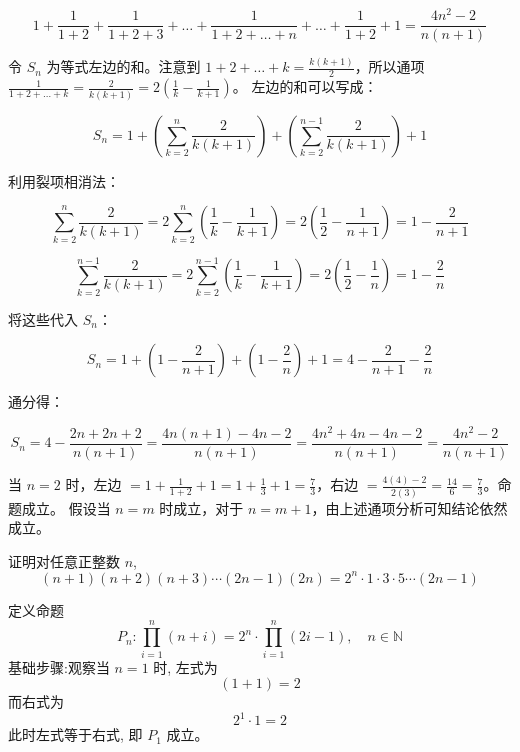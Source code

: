 \begin{questions}
$$1+\frac{1}{1+2}+\frac{1}{1+2+3}+\dots+\frac{1}{1+2+\dots+n}+\dots+\frac{1}{1+2}+1=\frac{4n^2-2}{n(n+1)}$$

\begin{solution}
令 $S_n$ 为等式左边的和。注意到 $1+2+\dots+k = \frac{k(k+1)}{2}$，所以通项 $\frac{1}{1+2+\dots+k} = \frac{2}{k(k+1)} = 2\left(\frac{1}{k}-\frac{1}{k+1}\right)$。
左边的和可以写成：


$$S_n = 1 + \left( \sum_{k=2}^{n} \frac{2}{k(k+1)} \right) + \left( \sum_{k=2}^{n-1} \frac{2}{k(k+1)} \right) + 1$$


利用裂项相消法：


$$\sum_{k=2}^{n} \frac{2}{k(k+1)} = 2 \sum_{k=2}^{n} \left(\frac{1}{k}-\frac{1}{k+1}\right) = 2 \left(\frac{1}{2} - \frac{1}{n+1}\right) = 1 - \frac{2}{n+1}$$

$$\sum_{k=2}^{n-1} \frac{2}{k(k+1)} = 2 \sum_{k=2}^{n-1} \left(\frac{1}{k}-\frac{1}{k+1}\right) = 2 \left(\frac{1}{2} - \frac{1}{n}\right) = 1 - \frac{2}{n}$$


将这些代入 $S_n$：


$$S_n = 1 + \left(1 - \frac{2}{n+1}\right) + \left(1 - \frac{2}{n}\right) + 1 = 4 - \frac{2}{n+1} - \frac{2}{n}$$


通分得：


$$S_n = 4 - \frac{2n+2n+2}{n(n+1)} = \frac{4n(n+1) - 4n - 2}{n(n+1)} = \frac{4n^2+4n-4n-2}{n(n+1)} = \frac{4n^2-2}{n(n+1)}$$


当 $n=2$ 时，左边 $= 1 + \frac{1}{1+2} + 1 = 1 + \frac{1}{3} + 1 = \frac{7}{3}$，右边 $= \frac{4(4)-2}{2(3)} = \frac{14}{6} = \frac{7}{3}$。命题成立。
假设当 $n=m$ 时成立，对于 $n=m+1$，由上述通项分析可知结论依然成立。
\end{solution}
    \question 证明对任意正整数 $n$, 
    \[
    (n + 1)(n + 2)(n + 3) \cdots (2n - 1)(2n) = 2^n \cdot 1 \cdot 3 \cdot 5 \cdots (2n - 1)
    \]
    \begin{solution}
        定义命题
        \[
        P_n:\prod_{i=1}^{n} (n + i) = 2^n \cdot \prod_{i=1}^{n} (2i - 1), \quad n \in \mathbb{N}
        \]
        基础步骤:观察当 $n=1$ 时, 左式为
        \[
        (1 + 1) = 2
        \]
        而右式为
        \[
        2^1 \cdot 1 = 2
        \]
        此时左式等于右式, 即 $P_1$ 成立。


\end{solution}
\end{questions}
